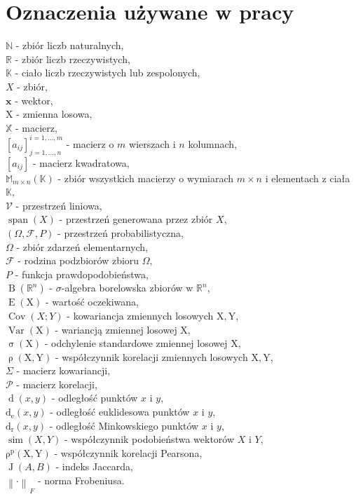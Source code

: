 \documentclass[12pt,a4paper]{report}
\newcommand{\setR}{\mathbb{R}}
\newcommand{\setK}{\mathbb{K}}
\newcommand{\setN}{\mathbb{N}}
\newcommand{\ro}[2]{\operatorname{\rho}\left( {#1},{#2} \right)}
\newcommand{\rop}[2]{\operatorname{\rho^p}\left( {#1},{#2} \right)}
\newcommand{\J}[2]{\operatorname{J}\left({#1}, {#2} \right)}
\newcommand{\similarity}[2]{\operatorname{sim}\left({#1}, {#2} \right)}
\newcommand{\przestrzen}[1]{\operatorname{span}\left({#1} \right)}
\newcommand{\distance}[2]{\operatorname{d}\left({#1}, {#2} \right)}
\newcommand{\distancee}[2]{\operatorname{d_r}\left({#1}, {#2} \right)}
\newcommand{\distanceee}[2]{\operatorname{d_e}\left({#1}, {#2} \right)}
\newcommand{\Covariance}[2]{\operatorname{Cov}\left({#1}; {#2} \right)}
\newcommand{\norm}[2][]{\left\| {#2} \right\|_{#1}}
\newcommand{\variance}[1]{\operatorname{Var}\left({#1} \right)}
\newcommand{\e}[1]{\operatorname{E}\left({#1} \right)}
\newcommand{\standard}[1]{\operatorname{\sigma}\left({#1} \right)}
\newcommand{\sigmacialo}[1]{\operatorname{B}\left({#1} \right)}
\begin{document}
\section{Oznaczenia używane w pracy}
$\setN$ - zbiór liczb naturalnych,
\\$\setR$ - zbiór liczb rzeczywistych,
\\$\setK$ - ciało liczb rzeczywistych lub zespolonych,
\\$\mathit{X}$ - zbiór,
\\$\mathbf{x}$ - wektor,
\\$\mathrm{X}$ - zmienna losowa,
\\$\mathbb{X}$ - macierz,
\\$[a_{ij}]_{j = 1, \ldots, n}^{i = 1, \ldots , m}$ - macierz o $m$ wierszach i $n$ kolumnach,
\\$[a_{ij}]$ - macierz kwadratowa,
\\$\mathbb{M}_{m \times n}(\setK)$ - zbiór wszystkich macierzy o wymiarach $m \times n$ i elementach z ciała $\setK$,
\\$\mathcal{V}$ - przestrzeń liniowa,
\\$\przestrzen{\mathit{X}}$ - przestrzeń generowana przez zbiór $\mathit{X}$,
\\$(\Omega, \mathcal{F}, P)$ - przestrzeń probabilistyczna,
\\$\Omega$ - zbiór zdarzeń elementarnych,
\\$\mathcal{F}$ - rodzina podzbiorów zbioru $\Omega$,
\\$P$ - funkcja prawdopodobieństwa,
\\$\sigmacialo{\setR^n}$ - $\sigma$-algebra borelowska zbiorów w $\setR^n$,
\\$\e{\mathrm{X}}$ - wartość oczekiwana,
\\$\Covariance{X}{Y}$ - kowariancja zmiennych losowych $\mathrm{X},\mathrm{Y}$,
\\$\variance{\mathrm{X}}$ - wariancją zmiennej losowej $\mathrm{X}$,
\\$\standard{\mathrm{X}}$ - odchylenie standardowe zmiennej losowej $\mathrm{X}$,
\\$\ro{\mathrm{X}}{\mathrm{Y}}$ - współczynnik korelacji zmiennych losowych $\mathrm{X},\mathrm{Y}$,
\\$\Sigma$ - macierz kowariancji,
\\$\mathcal{P}$ - macierz korelacji,
\\$\distance{x}{y}$ - odległość punktów $x$ i $y$,
\\$\distanceee{x}{y}$ - odległość euklidesowa punktów $x$ i $y$,
\\$\distancee{x}{y}$ - odległość Minkowskiego punktów $x$ i $y$,
\\$\similarity{X}{Y}$ - współczynnik podobieństwa wektorów $X$ i $Y$,
\\$\rop{\mathrm{X}}{\mathrm{Y}}$ - współczynnik korelacji Pearsona,
\\$\J{\mathit{A}}{\mathit{B}}$ - indeks Jaccarda,
\\ ${\norm{\cdot}}_F$ - norma Frobeniusa.
\end{document}
